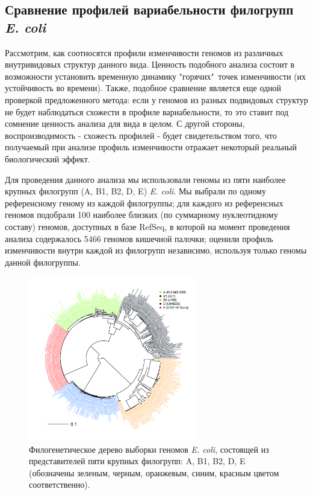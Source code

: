 \subsection{Сравнение профилей вариабельности филогрупп \textit{E. coli}}
Рассмотрим, как соотносятся профили изменчивости геномов из различных внутривидовых структур данного вида. Ценность подобного анализа состоит в возможности установить временную динамику "горячих"\ точек изменчивости (их устойчивость во времени). Также, подобное сравнение является еще одной проверкой предложенного метода: если у геномов из разных подвидовых структур не будет наблюдаться схожести в профиле вариабельности, то это ставит под сомнение ценность анализа для вида в целом. С другой стороны, воспроизводимость - схожесть профилей - будет свидетельством того, что получаемый при анализе профиль изменчивости отражает некоторый реальный биологический эффект. 

Для проведения данного анализа мы использовали геномы из пяти наиболее крупных филогрупп (A, B1, B2, D, E) \textit{E. coli}. Мы выбрали по одному референсному геному из каждой филогруппы; для каждого из референсных геномов подобрали 100 наиболее близких (по суммарному нуклеотидному составу) геномов, доступных в базе RefSeq, в которой на момент проведения анализа содержалось 5466 геномов кишечной палочки; оценили профиль изменчивости внутри каждой из филогрупп независимо, используя только геномы данной филогруппы. 

\begin{figure}[!ht] 
  \center
    \includegraphics[width=0.65\textwidth]{Dissertation/images/complexity/coli_phylogroups.png}
  \caption{Филогенетическое дерево выборки геномов \textit{E. coli}, состоящей из представителей пяти крупных филогрупп: A, B1, B2, D, E (обозначены зеленым, черным, оранжевым, синим, красным цветом соответственно).}
  \label{img:phylogroups} 
\end{figure}

